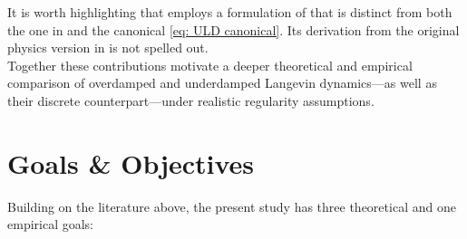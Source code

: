 \documentclass[12pt]{article}
\begin{document}
It is worth highlighting that \cite{qw20} employs a formulation of that is distinct from both the one in \cite{c18} and the canonical \eqref{eq: ULD canonical}.
Its derivation from the original physics version in \cite{l08} is not spelled out.\\

Together these contributions motivate a deeper theoretical and empirical comparison of overdamped and underdamped Langevin dynamics---as well as their discrete counterpart---under realistic regularity assumptions.


\section{Goals \& Objectives}

Building on the literature above, the present study has three theoretical and one empirical goals:
\end{document}
